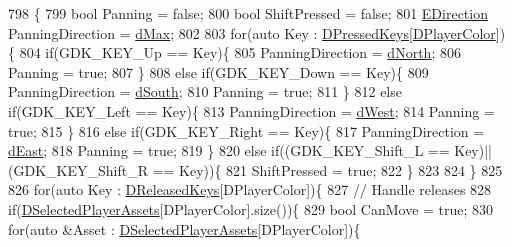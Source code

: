 \begin{DoxyCode}
798                                            \{
799     \textcolor{keywordtype}{bool} Panning = \textcolor{keyword}{false};
800     \textcolor{keywordtype}{bool} ShiftPressed = \textcolor{keyword}{false};
801     \hyperlink{GameDataTypes_8h_acb2b033915f6659a71a38b5aa6e4eb42}{EDirection} PanningDirection = \hyperlink{GameDataTypes_8h_acb2b033915f6659a71a38b5aa6e4eb42af6546049275557ce0ade2ceee042a319}{dMax};
802     
803     \textcolor{keywordflow}{for}(\textcolor{keyword}{auto} Key : \hyperlink{classCApplicationData_ac6f50c764f7561c0bd2a9fbce55b2701}{DPressedKeys}[\hyperlink{classCApplicationData_a53550939b20cba70570f113e4d1c5d02}{DPlayerColor}])\{
804         \textcolor{keywordflow}{if}(GDK\_KEY\_Up == Key)\{
805             PanningDirection = \hyperlink{GameDataTypes_8h_acb2b033915f6659a71a38b5aa6e4eb42a74d0139aee571cee88ff1393bbc6999e}{dNorth};
806             Panning = \textcolor{keyword}{true};
807         \}
808         \textcolor{keywordflow}{else} \textcolor{keywordflow}{if}(GDK\_KEY\_Down == Key)\{
809             PanningDirection = \hyperlink{GameDataTypes_8h_acb2b033915f6659a71a38b5aa6e4eb42ab97d9c3d0f527d3f74de60cc1889ecd0}{dSouth};
810             Panning = \textcolor{keyword}{true};
811         \}
812         \textcolor{keywordflow}{else} \textcolor{keywordflow}{if}(GDK\_KEY\_Left == Key)\{
813             PanningDirection = \hyperlink{GameDataTypes_8h_acb2b033915f6659a71a38b5aa6e4eb42a3006340383b02f53e16c07e89b1163b0}{dWest};
814             Panning = \textcolor{keyword}{true};
815         \}
816         \textcolor{keywordflow}{else} \textcolor{keywordflow}{if}(GDK\_KEY\_Right == Key)\{
817             PanningDirection = \hyperlink{GameDataTypes_8h_acb2b033915f6659a71a38b5aa6e4eb42a06b098879996cb811972f1fb43f11e55}{dEast};
818             Panning = \textcolor{keyword}{true};
819         \}
820         \textcolor{keywordflow}{else} \textcolor{keywordflow}{if}((GDK\_KEY\_Shift\_L == Key)||(GDK\_KEY\_Shift\_R == Key))\{
821             ShiftPressed = \textcolor{keyword}{true};   
822         \}
823         
824     \}
825     
826     \textcolor{keywordflow}{for}(\textcolor{keyword}{auto} Key : \hyperlink{classCApplicationData_adcef59167cadd8ee516884a7c0df08f6}{DReleasedKeys}[DPlayerColor])\{
827         \textcolor{comment}{// Handle releases}
828         \textcolor{keywordflow}{if}(\hyperlink{classCApplicationData_a05c1087d5a5c4ddc14fcb37444f1642b}{DSelectedPlayerAssets}[DPlayerColor].size())\{
829             \textcolor{keywordtype}{bool} CanMove = \textcolor{keyword}{true};
830             \textcolor{keywordflow}{for}(\textcolor{keyword}{auto} &Asset : \hyperlink{classCApplicationData_a05c1087d5a5c4ddc14fcb37444f1642b}{DSelectedPlayerAssets}[DPlayerColor])\{

\end{DoxyCode}
